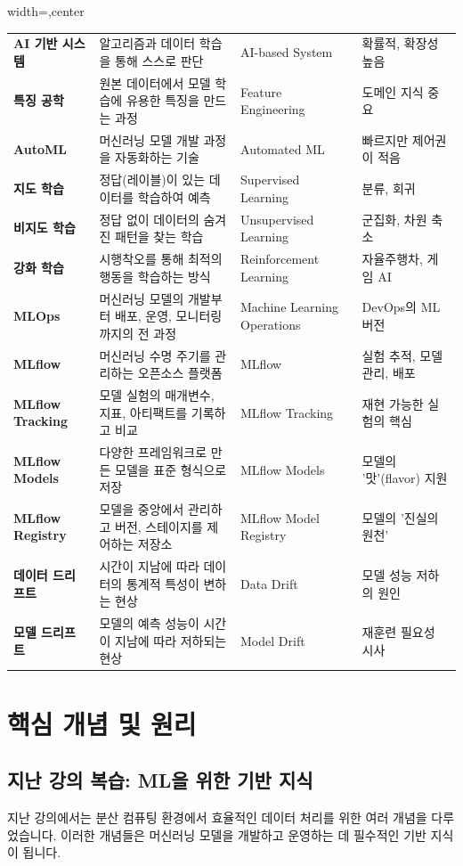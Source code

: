 \documentclass[11pt,a4paper]{article}
\theoremstyle{definition}
\begin{document}
\begin{tcolorbox}[summarybox={핵심 용어 및 설명}]
\begin{adjustbox}{width=\textwidth,center}
\begin{tabular}{llll}
\textbf{AI 기반 시스템} & 알고리즘과 데이터 학습을 통해 스스로 판단 & AI-based System & 확률적, 확장성 높음 \\
\textbf{특징 공학} & 원본 데이터에서 모델 학습에 유용한 특징을 만드는 과정 & Feature Engineering & 도메인 지식 중요 \\
\textbf{AutoML} & 머신러닝 모델 개발 과정을 자동화하는 기술 & Automated ML & 빠르지만 제어권이 적음 \\
\textbf{지도 학습} & 정답(레이블)이 있는 데이터를 학습하여 예측 & Supervised Learning & 분류, 회귀 \\
\textbf{비지도 학습} & 정답 없이 데이터의 숨겨진 패턴을 찾는 학습 & Unsupervised Learning & 군집화, 차원 축소 \\
\textbf{강화 학습} & 시행착오를 통해 최적의 행동을 학습하는 방식 & Reinforcement Learning & 자율주행차, 게임 AI \\
\textbf{MLOps} & 머신러닝 모델의 개발부터 배포, 운영, 모니터링까지의 전 과정 & Machine Learning Operations & DevOps의 ML 버전 \\
\textbf{MLflow} & 머신러닝 수명 주기를 관리하는 오픈소스 플랫폼 & MLflow & 실험 추적, 모델 관리, 배포 \\
\textbf{MLflow Tracking} & 모델 실험의 매개변수, 지표, 아티팩트를 기록하고 비교 & MLflow Tracking & 재현 가능한 실험의 핵심 \\
\textbf{MLflow Models} & 다양한 프레임워크로 만든 모델을 표준 형식으로 저장 & MLflow Models & 모델의 '맛'(flavor) 지원 \\
\textbf{MLflow Registry} & 모델을 중앙에서 관리하고 버전, 스테이지를 제어하는 저장소 & MLflow Model Registry & 모델의 '진실의 원천' \\
\textbf{데이터 드리프트} & 시간이 지남에 따라 데이터의 통계적 특성이 변하는 현상 & Data Drift & 모델 성능 저하의 원인 \\
\textbf{모델 드리프트} & 모델의 예측 성능이 시간이 지남에 따라 저하되는 현상 & Model Drift & 재훈련 필요성 시사 \\
\bottomrule
\end{tabular}
\end{adjustbox}
\end{tcolorbox}

\newpage
\section*{핵심 개념 및 원리}

\subsection*{지난 강의 복습: ML을 위한 기반 지식}
지난 강의에서는 분산 컴퓨팅 환경에서 효율적인 데이터 처리를 위한 여러 개념을 다루었습니다. 이러한 개념들은 머신러닝 모델을 개발하고 운영하는 데 필수적인 기반 지식이 됩니다.
\end{document}
